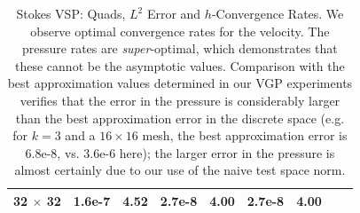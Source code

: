 \begin{table}[h!b!p!]
\begin{center}
\begin{tabular}{| c | c | c | c | c | c | c | c | c |}
32 $\times$ 32         	&1.6e-7	&4.52	&2.7e-8	&4.00	&2.7e-8      	&4.00	\\
\hline
\end{tabular}
\end{center} 
\caption{Stokes VSP: Quads, $L^{2}$ Error and $h$-Convergence Rates.  We observe optimal convergence rates for the velocity.  The pressure rates are \emph{super}-optimal, which demonstrates that these cannot be the asymptotic values.  Comparison with the best approximation values determined in our VGP experiments verifies that the error in the pressure is considerably larger than the best approximation error in the discrete space (e.g. for $k=3$ and a $16 \times 16$ mesh, the best approximation error is 6.8e-8, vs. 3.6e-6 here); the larger error in the pressure is almost certainly due to our use of the naive test space norm.}
\label{NVR:table:VSPQuadRates}
\end{table}



